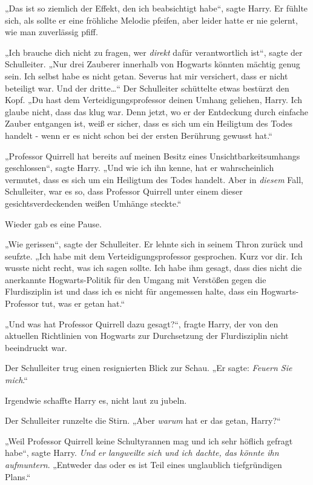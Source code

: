 {„Das ist so ziemlich der Effekt, den ich beabsichtigt habe“, sagte Harry. Er fühlte sich, als sollte er eine fröhliche Melodie pfeifen, aber leider hatte er nie gelernt, wie man zuverlässig pfiff.

„Ich brauche dich nicht zu fragen, wer \emph{direkt} dafür verantwortlich ist“, sagte der Schulleiter. „Nur drei Zauberer innerhalb von Hogwarts könnten mächtig genug sein. Ich selbst habe es nicht getan. Severus hat mir versichert, dass er nicht beteiligt war. Und der dritte…“ Der Schulleiter schüttelte etwas bestürzt den Kopf. „Du hast dem Verteidigungsprofessor deinen Umhang geliehen, Harry. Ich glaube nicht, dass das klug war. Denn jetzt, wo er der Entdeckung durch einfache Zauber entgangen ist, weiß er sicher, dass es sich um ein Heiligtum des Todes handelt - wenn er es nicht schon bei der ersten Berührung gewusst hat.“

„Professor Quirrell hat bereits auf meinen Besitz eines Unsichtbarkeitsumhangs geschlossen“, sagte Harry. „Und wie ich ihn kenne, hat er wahrscheinlich vermutet, dass es sich um ein Heiligtum des Todes handelt. Aber in \emph{diesem} Fall, Schulleiter, war es so, dass Professor Quirrell unter einem dieser gesichtsverdeckenden weißen Umhänge steckte.“

Wieder gab es eine Pause.

„Wie gerissen“, sagte der Schulleiter. Er lehnte sich in seinem Thron zurück und seufzte. „Ich habe mit dem Verteidigungsprofessor gesprochen. Kurz vor dir. Ich wusste nicht recht, was ich sagen sollte. Ich habe ihm gesagt, dass dies nicht die anerkannte Hogwarts-Politik für den Umgang mit Verstößen gegen die Flurdisziplin ist und dass ich es nicht für angemessen halte, dass ein Hogwarts-Professor tut, was er getan hat.“

„Und was hat Professor Quirrell dazu gesagt?“, fragte Harry, der von den aktuellen Richtlinien von Hogwarts zur Durchsetzung der Flurdisziplin nicht beeindruckt war.

Der Schulleiter trug einen resignierten Blick zur Schau. „Er sagte: \emph{Feuern Sie mich}.“

Irgendwie schaffte Harry es, nicht laut zu jubeln.

Der Schulleiter runzelte die Stirn. „Aber \emph{warum} hat er das getan, Harry?“

„Weil Professor Quirrell keine Schultyrannen mag und ich sehr höflich gefragt habe“, sagte Harry. \emph{Und er} \emph{langweilte} \emph{sich und ich dachte, das könnte ihn aufmuntern}. „Entweder das oder es ist Teil eines unglaublich tiefgründigen Plans.“

}
